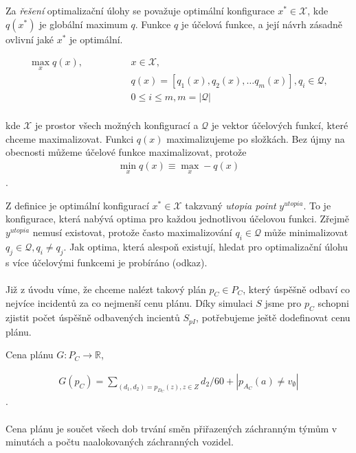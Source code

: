 Za \textit{řešení} optimalizační úlohy se považuje optimální konfigurace $x^* \in \mathcal{X}$, kde $q(x^*)$ je globální maximum $q$.
Funkce $q$ je účelová funkce, a její návrh zásadně ovlivní jaké $x^*$ je optimální. 
\\
\begin{definice}
  \begin{align}
    \max_{x} q(x), \hspace{50pt} &x \in \mathcal{X}, \\
                                 &q(x) = [q_1(x), q_2(x), \dots q_{m}(x)], q_i \in \mathcal{Q}, \\
                                 &0 \leq i \leq m, m = |\mathcal{Q}| 
  \end{align}
  \\
  kde $\mathcal{X}$ je prostor všech možných konfigurací a $\mathcal{Q}$ je vektor účelových funkcí, které chceme maximalizovat.
  Funkci $q(x)$ maximalizujeme po složkách.
  Bez újmy na obecnosti můžeme účelové funkce maximalizovat, protože
  \begin{align}
    \min_{x} q(x) \equiv \max_{x} -q(x)
  \end{align}
  .
\end{definice}

Z definice je optimální konfigurací $x^* \in \mathcal{X}$ takzvaný \textit{utopia point} $y^{utopia}$.
To je konfigurace, která nabývá optima pro každou jednotlivou účelovou funkci.
Zřejmě $y^{utopia}$ nemusí existovat, protože často maximalizování $q_i \in \mathcal{Q}$ může minimalizovat $q_j \in \mathcal{Q}, q_i \neq q_j$.
Jak optima, která alespoň existují, hledat pro optimalizační úlohu s více účelovými funkcemi je probíráno (odkaz). %
\\
\\
Již z úvodu víme, že chceme nalézt takový plán $p_C \in P_C$, který úspěšně odbaví co nejvíce incidentů za co nejmenší cenu plánu.
Díky simulaci $S$ jsme pro $p_C$ schopni zjistit počet úspěšně odbavených incientů $S_{pI}$, potřebujeme ještě dodefinovat cenu plánu.
\\
\begin{definice}
  Cena plánu $G \colon P_C \rightarrow \mathbb{R}$,

  \begin{align}
    G(p_C) = \sum_{(d_1, d_2) = p_{D_C}(z), z \in Z} d_2 / 60 + |p_{A_C}(a) \neq v_{\emptyset}|
  \end{align}
  .
  \\
  \\
  Cena plánu je součet všech dob trvání směn přiřazených záchranným týmům v minutách a počtu naalokovaných záchranných vozidel.
\end{definice}

